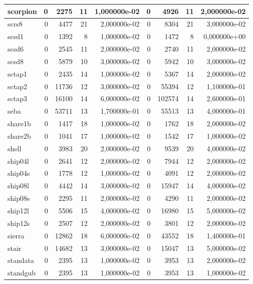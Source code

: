 \begin{tabular}{|l|r|r|r|r|r|r|r|r|}
scorpion & 0 & 2275 & 11 & 1,000000e-02 & 0 & 4926 & 11 & 2,000000e-02 \\ \hline
scrs8 & 0 & 4477 & 21 & 2,000000e-02 & 0 & 8304 & 21 & 3,000000e-02 \\ \hline
scsd1 & 0 & 1392 & 8 & 1,000000e-02 & 0 & 1472 & 8 & 0,000000e+00 \\ \hline
scsd6 & 0 & 2545 & 11 & 2,000000e-02 & 0 & 2740 & 11 & 2,000000e-02 \\ \hline
scsd8 & 0 & 5879 & 10 & 3,000000e-02 & 0 & 5942 & 10 & 3,000000e-02 \\ \hline
sctap1 & 0 & 2435 & 14 & 1,000000e-02 & 0 & 5367 & 14 & 2,000000e-02 \\ \hline
sctap2 & 0 & 11736 & 12 & 3,000000e-02 & 0 & 55394 & 12 & 1,100000e-01 \\ \hline
sctap3 & 0 & 16100 & 14 & 6,000000e-02 & 0 & 102574 & 14 & 2,600000e-01 \\ \hline
seba & 0 & 53711 & 13 & 1,700000e-01 & 0 & 55513 & 13 & 4,000000e-01 \\ \hline
share1b & 0 & 1417 & 18 & 1,000000e-02 & 0 & 1762 & 18 & 2,000000e-02 \\ \hline
share2b & 0 & 1041 & 17 & 1,000000e-02 & 0 & 1542 & 17 & 1,000000e-02 \\ \hline
shell & 0 & 3983 & 20 & 2,000000e-02 & 0 & 9539 & 20 & 4,000000e-02 \\ \hline
ship04l & 0 & 2641 & 12 & 2,000000e-02 & 0 & 7944 & 12 & 2,000000e-02 \\ \hline
ship04s & 0 & 1778 & 12 & 1,000000e-02 & 0 & 4091 & 12 & 2,000000e-02 \\ \hline
ship08l & 0 & 4442 & 14 & 3,000000e-02 & 0 & 15947 & 14 & 4,000000e-02 \\ \hline
ship08s & 0 & 2295 & 11 & 2,000000e-02 & 0 & 4290 & 11 & 2,000000e-02 \\ \hline
ship12l & 0 & 5506 & 15 & 4,000000e-02 & 0 & 16980 & 15 & 5,000000e-02 \\ \hline
ship12s & 0 & 2507 & 12 & 2,000000e-02 & 0 & 3801 & 12 & 2,000000e-02 \\ \hline
sierra & 0 & 12862 & 18 & 6,000000e-02 & 0 & 43552 & 18 & 1,400000e-01 \\ \hline
stair & 0 & 14682 & 13 & 3,000000e-02 & 0 & 15047 & 13 & 5,000000e-02 \\ \hline
standata & 0 & 2395 & 13 & 1,000000e-02 & 0 & 3953 & 13 & 2,000000e-02 \\ \hline
standgub & 0 & 2395 & 13 & 1,000000e-02 & 0 & 3953 & 13 & 1,000000e-02 \\ \hline

\end{tabular}
